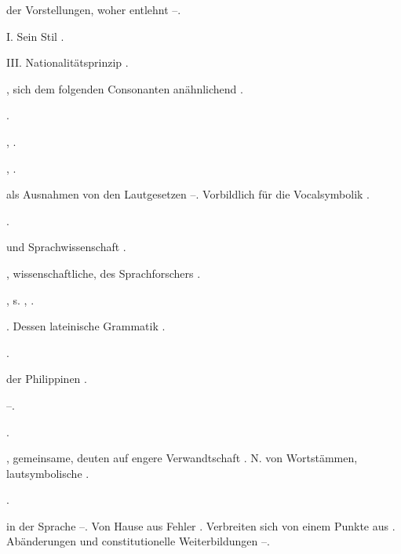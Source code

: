 \begin{register}

 der Vorstellungen, woher entlehnt \pageref{sp.40}–\pageref{sp.42}.


 I. Sein Stil \pageref{sp.465}.

 III. Nationalitätsprinzip \pageref{sp.261}.


, sich dem folgenden Consonanten anähnlichend \pageref{sp.201}. 

 \pageref{sp.186}.

 \pageref{sp.36}, \pageref{sp.184}.


 \pageref{sp.55}, \pageref{sp.261}.

 als Ausnahmen von den Lautgesetzen \pageref{sp.208}–\pageref{sp.210}. Vorbildlich für die Vocalsymbolik \pageref{sp.255}. 

 \pageref{sp.387}.

 und Sprachwissenschaft \pageref{sp.15}.

, wissenschaftliche, des Sprachforschers \pageref{sp.53}.

, s. , .

. Dessen lateinische Grammatik \pageref{sp.106}.

 \pageref{sp.103}.

 der Philippinen \pageref{sp.280}.

 \pageref{sp.307}–\pageref{sp.308}.

 \pageref{sp.280}.

, gemeinsame, deuten auf engere Verwandtschaft \pageref{sp.159}. N. von Wortstämmen, lautsymbolische \pageref{sp.223}.

 \pageref{sp.165}.

 in der Sprache \pageref{sp.126}–\pageref{sp.127}. Von Hause aus Fehler \pageref{sp.184}. Verbreiten sich von einem Punkte aus \pageref{sp.229}.  Abänderungen und constitutionelle Weiterbildungen \pageref{sp.428}–\pageref{sp.429}.


\end{register}
